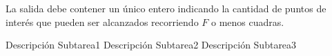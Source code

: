 \documentclass{oci}
\begin{document}
\begin{outputDescription}
  La salida debe contener un único entero indicando la cantidad de puntos de interés que pueden
  ser alcanzados recorriendo $F$ o menos cuadras.
\end{outputDescription}

\begin{scoreDescription}
  Descripción Subtarea1
  Descripción Subtarea2
  Descripción Subtarea3
\end{scoreDescription}

\begin{sampleDescription}
\end{sampleDescription}
\end{document}
